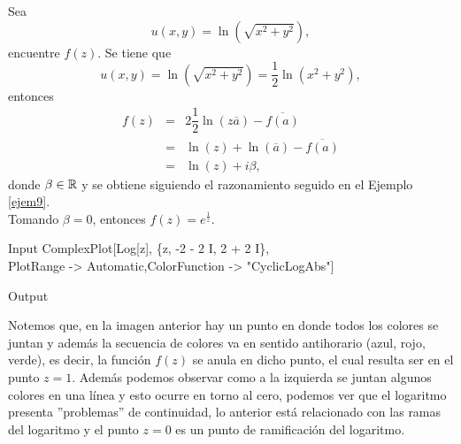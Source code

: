\begin{Ejem}
	Sea $$u(x,y)=\ln(\sqrt{x^2+y^2}),$$  encuentre $f(z)$.
	\solu
	Se tiene que $$u(x,y)=\ln(\sqrt{x^2+y^2})=\dfrac{1}{2}\ln(x^2+y^2),$$
	entonces 
	\[
		\begin{array}{ccl}
			f(z)&=&2\dfrac{1}{2}\ln(z\overline{a})-\overline{f(a)}\\
			&=&\ln(z)+\ln(\overline{a})-\overline{f(a)}\\
			&=&\ln(z)+i\beta,
		\end{array}
	\]
	donde $\beta\in \mathbb{R}$ y se obtiene siguiendo el razonamiento seguido en el Ejemplo \ref{ejem9}.\\
	Tomando $\beta=0$, entonces $f(z)=e^{\frac{1}{z}}$.
	\begin{mmaCell}{Input}
		ComplexPlot[Log[z], \{z, -2 - 2 I, 2 + 2 I\},\\PlotRange -> Automatic,ColorFunction -> "CyclicLogAbs"]
	\end{mmaCell}
	
	\begin{mmaCell}[moregraphics={moreig={scale=.25}}]{Output}
	\end{mmaCell}
\end{Ejem}
Notemos que, en la imagen anterior hay un punto en donde todos los colores se juntan y además la secuencia de colores va en sentido antihorario (azul, rojo, verde), es decir, la función $f(z)$ se anula en dicho punto, el cual resulta ser en el punto $z=1$. Además podemos observar como a la izquierda se juntan algunos colores en una línea  y esto ocurre en torno al cero, podemos ver que el logaritmo presenta ''problemas'' de continuidad, lo anterior está relacionado con las ramas del logaritmo y el punto $z=0$ es un punto de ramificación del logaritmo.\endproof

